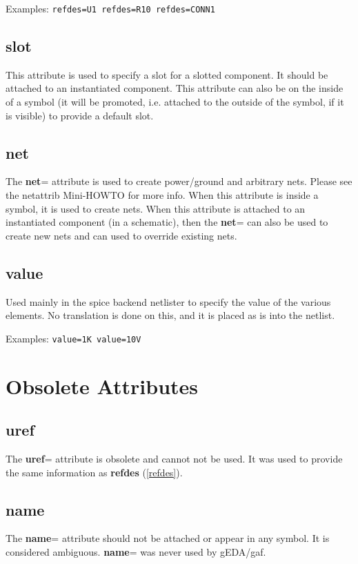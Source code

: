 \documentclass{article}
\begin{document}
Examples: \texttt{refdes=U1 refdes=R10 refdes=CONN1}

\subsection{{\bf slot}\label{slot}}
This attribute is used to specify a slot for a slotted component.
It should be attached to an instantiated component.  This attribute can
also be on the inside of a symbol (it will be promoted, i.e. attached
to the outside of the symbol, if it is visible) to provide a default
slot.

\subsection{{\bf net}\label{net}}
The {\bf net}= attribute is used to create power/ground and arbitrary nets.
Please see the netattrib Mini-HOWTO for more info.  When this attribute
is inside a symbol, it is used to create nets.  When this attribute is
attached to an instantiated component (in a schematic), then the
{\bf net}= can also be used to create new nets and can used to override
existing nets.

\subsection{{\bf value}\label{value}}
Used mainly in the spice backend netlister to specify the value of the
various elements.  No translation is done on this, and it is placed as
is into the netlist.

Examples: \texttt{value=1K value=10V}


\section{Obsolete Attributes}

\subsection{{\bf uref}\label{uref}}
The {\bf uref}= attribute is obsolete and cannot not be used.  It was used
to provide the same information as {\bf refdes} (\ref{refdes}).


\subsection{{\bf name}\label{name}}
The {\bf name}= attribute should not be attached or appear in any symbol.
It is considered ambiguous.  {\bf name}= was never used by gEDA/gaf.
\end{document}
